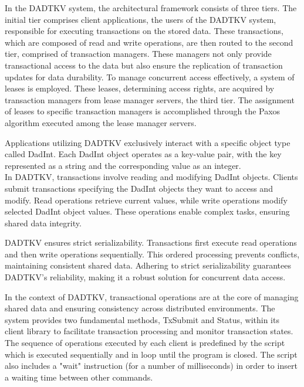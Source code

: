 \documentclass[times, 10pt,twocolumn]{article}
\begin{document}
In the DADTKV system, the architectural framework consists of three tiers. 
The initial tier comprises client applications, the users of the DADTKV system, 
responsible for executing transactions on the stored data. These transactions, 
which are composed of read and write operations, are then routed to the second 
tier, comprised of transaction managers. These managers not only provide transactional 
access to the data but also ensure the replication of transaction updates for data 
durability. To manage concurrent access effectively, a system of leases is employed. 
These leases, determining access rights, are acquired by transaction managers from 
lease manager servers, the third tier. The assignment of leases to specific 
transaction managers is accomplished through the Paxos algorithm executed among 
the lease manager servers.


Applications utilizing DADTKV exclusively interact with a specific object type 
called DadInt. Each DadInt object operates as a key-value pair, with the key 
represented as a string and the corresponding value as an integer.\\

In DADTKV, transactions involve reading and modifying DadInt objects. Clients 
submit transactions specifying the DadInt objects they want to access and 
modify. Read operations retrieve current values, while write operations 
modify selected DadInt object values. These operations enable complex tasks, 
ensuring shared data integrity.

DADTKV ensures strict serializability. Transactions first execute 
read operations and then write operations sequentially. This ordered processing 
prevents conflicts, maintaining consistent shared data. Adhering to strict 
serializability guarantees DADTKV's reliability, making it a robust solution for 
concurrent data access.\\


In the context of DADTKV, transactional operations are at the core of managing 
shared data and ensuring consistency across distributed environments. The system 
provides two fundamental methods, TxSubmit and Status, within its client library 
to facilitate transaction processing and monitor transaction states. The sequence 
of operations executed by each client is predefined by the script which is executed 
sequentially and in loop until the program is closed. The script also includes a 
"wait" instruction (for a number of milliseconds) in order to insert a waiting time 
between other commands.
\end{document}
